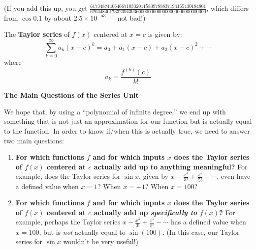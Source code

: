 \documentclass[main]{subfiles}
\begin{document}
\begin{enumerate}
\begin{enumerate}
\begin{solution}
    (If you add this up, you get
    $\frac{617348744064667103320115839788837194165430184801}{620448401733239439
    360000000000000000000000000000}$, which differs from $\cos 0.1$ by
    about $2.5 \times 10^{-53}$ --- not bad!)
    \end{solution}
  \end{enumerate}

  \begin{framed}
The \textbf{Taylor series} of $f(x)$ centered at $x=c$ is given by:
$$\sum_{k=0}^{\infty} a_k(x-c)^k =a_0+a_1(x-c)+a_2(x-c)^2+ \cdots$$
where $$a_k=\frac{f^{(k)}(c)}{k!}$$
\end{framed}
\begin{framed}
  \centerline{\textbf{The Main Questions of the Series Unit}}
  We hope that, by using a ``polynomial of infinite degree,'' we end up with
  something that is not just an approximation for our function but is
  actually equal to the function. In order to know if/when this is actually true, we need to answer two main questions:
  \begin{enumerate}
  \item \textbf{For which functions $f$ and for which inputs $x$ does the Taylor series of $f(x)$ centered at $c$ actually add up to anything meaningful?} For example, does the Taylor series for $\sin x$, given by $x - \frac{x^3}{3!} + \frac{x^5}{5!} - \cdots$, even have a defined value when $x=1$? When $x=-1$? When $x=100$?
  \item \textbf{For which functions $f$ and for which inputs $x$ does the Taylor series of $f(x)$ centered at $c$ actually add up \textit{specifically to} $f(x)$?} For example, perhaps the Taylor series $x - \frac{x^3}{3!} + \frac{x^5}{5!} - \cdots$ has a defined value when $x=100$, but is \textit{not} actually equal to $\sin(100)$. (In this case, our Taylor series for $\sin x$ wouldn't be very useful!)
  \end{enumerate}
  \end{framed}

\end{enumerate}
\end{document}
